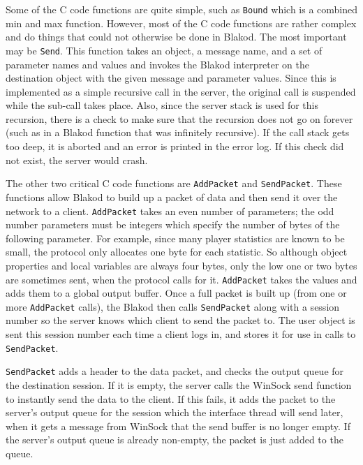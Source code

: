 Some of the C code functions are quite simple, such as \texttt{Bound}
which is a combined min and max function.  However, most of the C code
functions are rather complex and do things that could not otherwise be
done in Blakod.  The most important may be \texttt{Send}.  This
function takes an object, a message name, and a set of parameter names
and values and invokes the Blakod interpreter on the destination
object with the given message and parameter values.  Since this is
implemented as a simple recursive call in the server, the original
call is suspended while the sub-call takes place.  Also, since the
server stack is used for this recursion, there is a check to make sure
that the recursion does not go on forever (such as in a Blakod
function that was infinitely recursive).  If the call stack gets too
deep, it is aborted and an error is printed in the error log.  If this
check did not exist, the server would crash.

The other two critical C code functions are \texttt{AddPacket} and
\texttt{SendPacket}.  These functions allow Blakod to build up a
packet of data and then send it over the network to a client.
\texttt{AddPacket} takes an even number of parameters; the odd number
parameters must be integers which specify the number of bytes of the
following parameter.  For example, since many player statistics are
known to be small, the protocol only allocates one byte for each
statistic.  So although object properties and local variables are
always four bytes, only the low one or two bytes are sometimes sent,
when the protocol calls for it.  \texttt{AddPacket} takes the values
and adds them to a global output buffer.  Once a full packet is built
up (from one or more \texttt{AddPacket} calls), the Blakod then calls
\texttt{SendPacket} along with a session number so the server knows
which client to send the packet to.  The user object is sent this
session number each time a client logs in, and stores it for use in
calls to \texttt{SendPacket}.

\texttt{SendPacket} adds a header to the data packet, and checks the
output queue for the destination session.  If it is empty, the server
calls the WinSock send function to instantly send the data to the
client.  If this fails, it adds the packet to the server's output
queue for the session which the interface thread will send later, when
it gets a message from WinSock that the send buffer is no longer
empty.  If the server's output queue is already non-empty, the packet
is just added to the queue.

